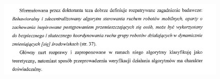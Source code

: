 \section*{}
\begin{frame}
\frametitle{\secname}
\begin{figure}[!ht]
	\centering
	\includegraphics[page=4, width=\textwidth]{img/ReviewZubert.pdf}	
\end{figure}
\end{frame}

